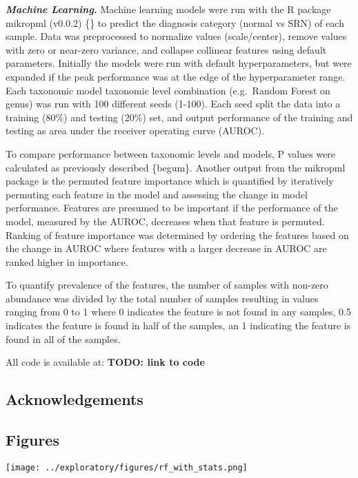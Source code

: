 \documentclass[
]{article}
\begin{document}
\textbf{\emph{Machine Learning.}} Machine learning models were run with
the R package mikropml (v0.0.2) \{\} to predict the diagnosis category
(normal vs SRN) of each sample. Data was preprocessed to normalize
values (scale/center), remove values with zero or near-zero variance,
and collapse collinear features using default parameters. Initially the
models were run with default hyperparameters, but were expanded if the
peak performance was at the edge of the hyperparameter range. Each
taxonomic model taxonomic level combination (e.g.~Random Forest on
genus) was run with 100 different seeds (1-100). Each seed split the
data into a training (80\%) and testing (20\%) set, and output
performance of the training and testing as area under the receiver
operating curve (AUROC).

To compare performance between taxonomic levels and models, P values
were calculated as previously described \{begum\}. Another output from
the mikropml package is the permuted feature importance which is
quantified by iteratively permuting each feature in the model and
assessing the change in model performance. Features are presumed to be
important if the performance of the model, measured by the AUROC,
decreases when that feature is permuted. Ranking of feature importance
was determined by ordering the features based on the change in AUROC
where features with a larger decrease in AUROC are ranked higher in
importance.

To quantify prevalence of the features, the number of samples with
non-zero abundance was divided by the total number of samples resulting
in values ranging from 0 to 1 where 0 indicates the feature is not found
in any samples, 0.5 indicates the feature is found in half of the
samples, an 1 indicating the feature is found in all of the samples.

All code is available at: \textbf{TODO: link to code}

\hypertarget{acknowledgements}{%
\subsection{Acknowledgements}\label{acknowledgements}}

\newpage

\hypertarget{figures}{%
\subsection{Figures}\label{figures}}

\texttt{[image: ../exploratory/figures/rf\_with\_stats.png]}
\end{document}
